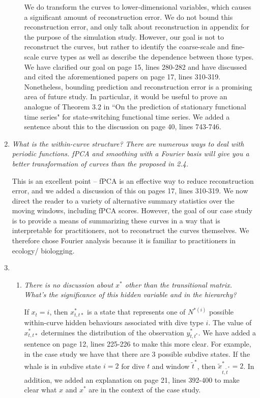 \documentclass{article}
\begin{document}
\begin{enumerate}
\begin{enumerate}
        We do transform the curves to lower-dimensional variables, which causes a significant amount of reconstruction error. We do not bound this reconstruction error, and only talk about reconstruction in appendix for the purpose of the simulation study. However, our goal is not to reconstruct the curves, but rather to identify the coarse-scale and fine-scale curve types as well as describe the dependence between those types. We have clarified our goal on page 15, lines 280-282 and have discussed and cited the aforementioned papers on page 17, lines 310-319. Nonetheless, bounding prediction and reconstruction error is a promising area of future study. In particular, it would be useful to prove an analogue of Theorem 3.2 in ``On the prediction of stationary functional time series" for state-switching functional time series. We added a sentence about this to the discussion on page 40, lines 743-746.
        
    \end{enumerate}
    
    \item \textit{What is the within-curve structure? There are numerous ways to deal with periodic functions. fPCA and smoothing with a Fourier basis will give you a better transformation of curves than the proposed in 2.4.} 
    
    This is an excellent point -- fPCA is an effective way to reduce reconstruction error, and we added a discussion of this on pages 17, lines 310-319. We now direct the reader to a variety of alternative summary statistics over the moving windows, including fPCA scores. However, the goal of our case study is to provide a means of summarizing these curves in a way that is interpretable for practitioners, not to reconstruct the curves themselves. We therefore chose Fourier analysis because it is familiar to practitioners in ecology/ biologging.
    
    \item \begin{enumerate}
        \item \textit{There is no discussion about $x^*$ other than the transitional matrix. What's the significance of this hidden variable and in the hierarchy?} 
        
        If $x_t = i$, then $x_{t,t*}^*$ is a state that represents one of $N^{*(i)}$ possible within-curve hidden behaviours associated with dive type $i$. The value of $x_{t,t*}^*$ determines the distribution of the observation $y^*_{t,t^*}$. We have added a sentence on page 12, lines 225-226 to make this more clear. For example, in the case study we have that there are 3 possible subdive states. If the whale is in subdive state $i =2$ for dive $t$ and window $\tilde t^*$, then $\tilde x^*_{t,\tilde t^*} = 2$.  In addition, we added an explanation on page 21, lines 392-400 to make clear what $x$ and $x^*$ are in the context of the case study. 
        

\end{enumerate}
\end{enumerate}
\end{document}
